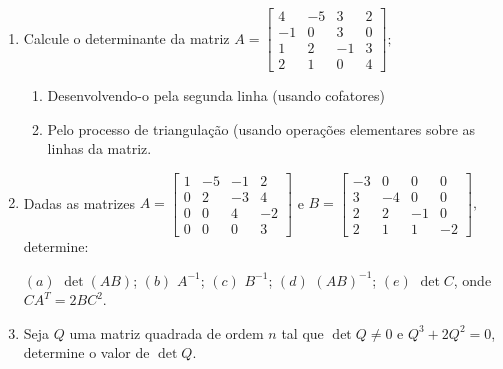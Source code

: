 \documentclass{report}
\begin{document}
\begin{Exercise}
\begin{enumerate}

\item \label{1lista28} Calcule o determinante da matriz $A= \left[
\begin{array}{rrrr}
4 & -5 & 3 & 2 \\
-1 & 0 & 3 & 0 \\
1 & 2 & -1 & 3 \\
2 & 1 & 0 & 4
\end{array}
\right];$
\begin{enumerate}
    \item Desenvolvendo-o pela segunda linha (usando cofatores)
    \item Pelo processo de triangulação (usando operações
    elementares sobre as linhas da matriz.
\end{enumerate}


\item \label{1lista29} Dadas as matrizes $A= \left[
\begin{array}{rrrr}
1 & -5 & -1 & 2 \\
0 & 2 & -3 & 4 \\
0 & 0 & 4 & -2 \\
0 & 0 & 0 & 3
\end{array}
\right]$ e $B= \left[
\begin{array}{rrrr}
-3 & 0 & 0 & 0 \\
3 & -4 & 0 & 0 \\
2 & 2 & -1 & 0 \\
2 & 1 & 1 & -2
\end{array}
\right],$ determine:

$(a)$ $\det (AB)$; \hspace{0.5cm} $(b)$ $A^{-1}$; \hspace{0.5cm}
$(c)$ $B^{-1}$; \hspace{0.5cm} $(d)$ $(AB)^{-1}$; \hspace{0.5cm}
$(e)$ $\det C$, onde $C A^T=2BC^2$.


\item \label{1lista30} Seja $Q$ uma matriz quadrada de ordem $n$
tal que $\det Q \ne 0$ e $Q^3 +2 Q^2 =0$, determine o valor de
$\det Q$.



\end{enumerate}
\end{Exercise}
\end{document}
